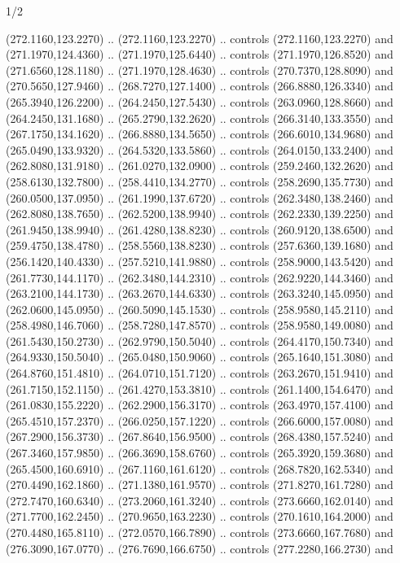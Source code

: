 \begin{flagdescription}{1/2}
\begin{scope}[xshift=0.5\flaglength]
\begin{scope}[scale=0.004\flagwidth,xshift=-90mm,yshift=89mm]
\begin{scope}[y=0.80pt, x=0.80pt, yscale=-1, xscale=1, inner sep=0pt, outer sep=0pt]
\begin{scope}[cm={{-1.0,0.0,0.0,1.0,(639.96566,0.0)}},shift={(0,0)}]
  (272.1160,123.2270) .. (272.1160,123.2270) .. controls (272.1160,123.2270) and
  (271.1970,124.4360) .. (271.1970,125.6440) .. controls (271.1970,126.8520) and
  (271.6560,128.1180) .. (271.1970,128.4630) .. controls (270.7370,128.8090) and
  (270.5650,127.9460) .. (268.7270,127.1400) .. controls (266.8880,126.3340) and
  (265.3940,126.2200) .. (264.2450,127.5430) .. controls (263.0960,128.8660) and
  (264.2450,131.1680) .. (265.2790,132.2620) .. controls (266.3140,133.3550) and
  (267.1750,134.1620) .. (266.8880,134.5650) .. controls (266.6010,134.9680) and
  (265.0490,133.9320) .. (264.5320,133.5860) .. controls (264.0150,133.2400) and
  (262.8080,131.9180) .. (261.0270,132.0900) .. controls (259.2460,132.2620) and
  (258.6130,132.7800) .. (258.4410,134.2770) .. controls (258.2690,135.7730) and
  (260.0500,137.0950) .. (261.1990,137.6720) .. controls (262.3480,138.2460) and
  (262.8080,138.7650) .. (262.5200,138.9940) .. controls (262.2330,139.2250) and
  (261.9450,138.9940) .. (261.4280,138.8230) .. controls (260.9120,138.6500) and
  (259.4750,138.4780) .. (258.5560,138.8230) .. controls (257.6360,139.1680) and
  (256.1420,140.4330) .. (257.5210,141.9880) .. controls (258.9000,143.5420) and
  (261.7730,144.1170) .. (262.3480,144.2310) .. controls (262.9220,144.3460) and
  (263.2100,144.1730) .. (263.2670,144.6330) .. controls (263.3240,145.0950) and
  (262.0600,145.0950) .. (260.5090,145.1530) .. controls (258.9580,145.2110) and
  (258.4980,146.7060) .. (258.7280,147.8570) .. controls (258.9580,149.0080) and
  (261.5430,150.2730) .. (262.9790,150.5040) .. controls (264.4170,150.7340) and
  (264.9330,150.5040) .. (265.0480,150.9060) .. controls (265.1640,151.3080) and
  (264.8760,151.4810) .. (264.0710,151.7120) .. controls (263.2670,151.9410) and
  (261.7150,152.1150) .. (261.4270,153.3810) .. controls (261.1400,154.6470) and
  (261.0830,155.2220) .. (262.2900,156.3170) .. controls (263.4970,157.4100) and
  (265.4510,157.2370) .. (266.0250,157.1220) .. controls (266.6000,157.0080) and
  (267.2900,156.3730) .. (267.8640,156.9500) .. controls (268.4380,157.5240) and
  (267.3460,157.9850) .. (266.3690,158.6760) .. controls (265.3920,159.3680) and
  (265.4500,160.6910) .. (267.1160,161.6120) .. controls (268.7820,162.5340) and
  (270.4490,162.1860) .. (271.1380,161.9570) .. controls (271.8270,161.7280) and
  (272.7470,160.6340) .. (273.2060,161.3240) .. controls (273.6660,162.0140) and
  (271.7700,162.2450) .. (270.9650,163.2230) .. controls (270.1610,164.2000) and
  (270.4480,165.8110) .. (272.0570,166.7890) .. controls (273.6660,167.7680) and
  (276.3090,167.0770) .. (276.7690,166.6750) .. controls (277.2280,166.2730) and

\end{scope}
\end{scope}
\end{scope}
\end{scope}
\end{flagdescription}
